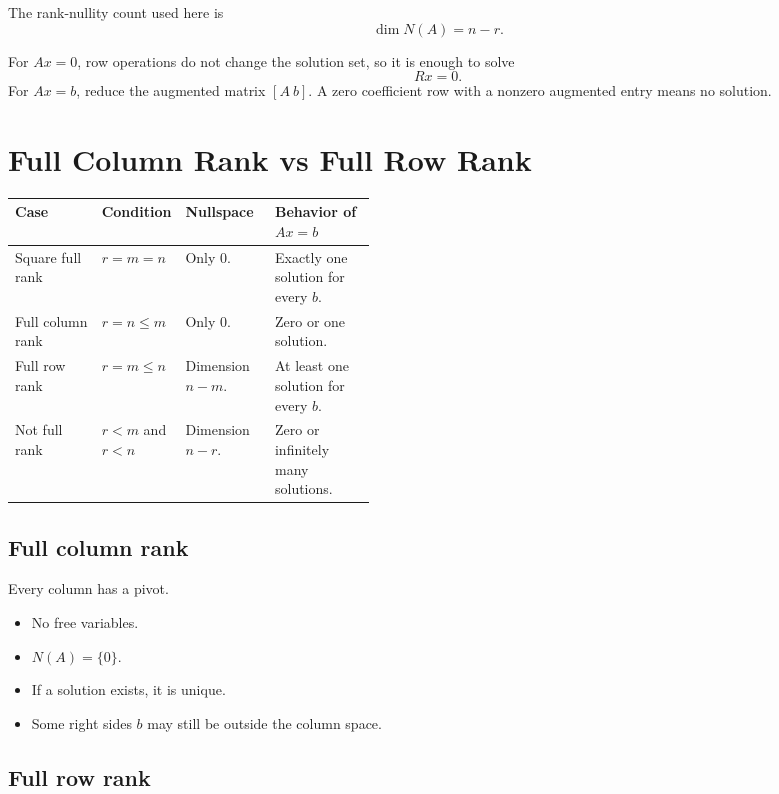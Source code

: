 \documentclass[10pt]{article}
\begin{document}
The rank-nullity count used here is
\[
\dim N(A)=n-r.
\]

For \(Ax=0\), row operations do not change the solution set, so it is enough to solve
\[
Rx=0.
\]
For \(Ax=b\), reduce the augmented matrix \([A\ b]\). A zero coefficient row with a nonzero augmented entry means no solution.

\section{Full Column Rank vs Full Row Rank}

\begin{center}
\small
\begin{tabularx}{\linewidth}{@{}L{0.24\linewidth}L{0.18\linewidth}Y Y@{}}
\toprule
Case & Condition & Nullspace & Behavior of \(Ax=b\) \\
\midrule
Square full rank & \(r=m=n\) & Only \(0\). & Exactly one solution for every \(b\). \\
Full column rank & \(r=n\le m\) & Only \(0\). & Zero or one solution. \\
Full row rank & \(r=m\le n\) & Dimension \(n-m\). & At least one solution for every \(b\). \\
Not full rank & \(r<m\) and \(r<n\) & Dimension \(n-r\). & Zero or infinitely many solutions. \\
\bottomrule
\end{tabularx}
\end{center}

\subsection{Full column rank}

Every column has a pivot.
\begin{itemize}
  \item No free variables.
  \item \(N(A)=\{0\}\).
  \item If a solution exists, it is unique.
  \item Some right sides \(b\) may still be outside the column space.
\end{itemize}

\subsection{Full row rank}
\end{document}
